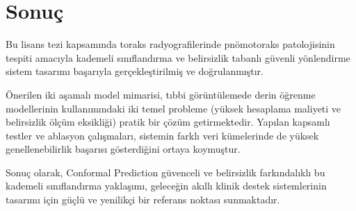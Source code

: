 \chapter{Sonuç}
\label{ch:sonuc}

Bu lisans tezi kapsamında toraks radyografilerinde pnömotoraks patolojisinin tespiti amacıyla kademeli sınıflandırma ve belirsizlik tabanlı güvenli yönlendirme sistem tasarımı başarıyla gerçekleştirilmiş ve doğrulanmıştır.

Önerilen iki aşamalı model mimarisi, tıbbi görüntülemede derin öğrenme modellerinin kullanımındaki iki temel probleme (yüksek hesaplama maliyeti ve belirsizlik ölçüm eksikliği) pratik bir çözüm getirmektedir. Yapılan kapsamlı testler ve ablasyon çalışmaları, sistemin farklı veri kümelerinde de yüksek genellenebilirlik başarısı gösterdiğini ortaya koymuştur.

Sonuç olarak, Conformal Prediction güvenceli ve belirsizlik farkındalıklı bu kademeli sınıflandırma yaklaşımı, geleceğin akıllı klinik destek sistemlerinin tasarımı için güçlü ve yenilikçi bir referans noktası sunmaktadır.

